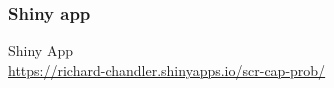 \documentclass[color=usenames,dvipsnames]{beamer}\usepackage[]{graphicx}\usepackage[]{xcolor}
\begin{document}
\begin{frame}
  \frametitle{Shiny app}
  \LARGE
  \centering
  Shiny App \\
  \vfill
  \normalsize
  \color{blue}
  \url{
    https://richard-chandler.shinyapps.io/scr-cap-prob/
  } \\
\end{frame}




\end{document}
